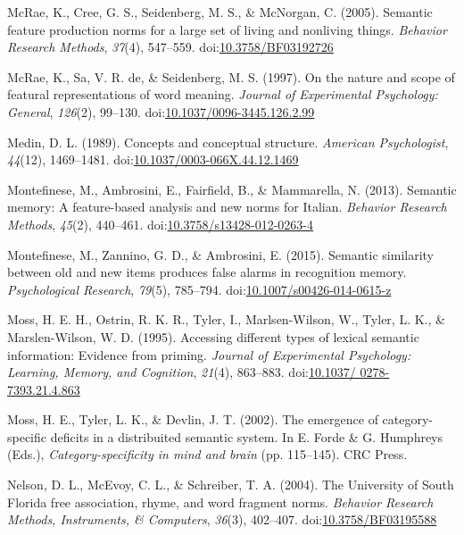 \documentclass[english,,man]{apa6}
\theoremstyle{definition}
\theoremstyle{definition}
\theoremstyle{definition}
\theoremstyle{remark}
\begin{document}
\hypertarget{ref-McRae2005}{}
McRae, K., Cree, G. S., Seidenberg, M. S., \& McNorgan, C. (2005).
Semantic feature production norms for a large set of living and
nonliving things. \emph{Behavior Research Methods}, \emph{37}(4),
547--559.
doi:\href{https://doi.org/10.3758/BF03192726}{10.3758/BF03192726}

\hypertarget{ref-McRae1997}{}
McRae, K., Sa, V. R. de, \& Seidenberg, M. S. (1997). On the nature and
scope of featural representations of word meaning. \emph{Journal of
Experimental Psychology: General}, \emph{126}(2), 99--130.
doi:\href{https://doi.org/10.1037/0096-3445.126.2.99}{10.1037/0096-3445.126.2.99}

\hypertarget{ref-Medin1989}{}
Medin, D. L. (1989). Concepts and conceptual structure. \emph{American
Psychologist}, \emph{44}(12), 1469--1481.
doi:\href{https://doi.org/10.1037/0003-066X.44.12.1469}{10.1037/0003-066X.44.12.1469}

\hypertarget{ref-Montefinese2013}{}
Montefinese, M., Ambrosini, E., Fairfield, B., \& Mammarella, N. (2013).
Semantic memory: A feature-based analysis and new norms for Italian.
\emph{Behavior Research Methods}, \emph{45}(2), 440--461.
doi:\href{https://doi.org/10.3758/s13428-012-0263-4}{10.3758/s13428-012-0263-4}

\hypertarget{ref-Montefinese2015}{}
Montefinese, M., Zannino, G. D., \& Ambrosini, E. (2015). Semantic
similarity between old and new items produces false alarms in
recognition memory. \emph{Psychological Research}, \emph{79}(5),
785--794.
doi:\href{https://doi.org/10.1007/s00426-014-0615-z}{10.1007/s00426-014-0615-z}

\hypertarget{ref-Moss1995}{}
Moss, H. E. H., Ostrin, R. K. R., Tyler, I., Marlsen-Wilson, W., Tyler,
L. K., \& Marslen-Wilson, W. D. (1995). Accessing different types of
lexical semantic information: Evidence from priming. \emph{Journal of
Experimental Psychology: Learning, Memory, and Cognition}, \emph{21}(4),
863--883.
doi:\href{https://doi.org/10.1037/\%200278-7393.21.4.863}{10.1037/ 0278-7393.21.4.863}

\hypertarget{ref-Moss2002}{}
Moss, H. E., Tyler, L. K., \& Devlin, J. T. (2002). The emergence of
category-specific deficits in a distribuited semantic system. In E.
Forde \& G. Humphreys (Eds.), \emph{Category-specificity in mind and
brain} (pp. 115--145). CRC Press.

\hypertarget{ref-Nelson2004}{}
Nelson, D. L., McEvoy, C. L., \& Schreiber, T. A. (2004). The University
of South Florida free association, rhyme, and word fragment norms.
\emph{Behavior Research Methods, Instruments, \& Computers},
\emph{36}(3), 402--407.
doi:\href{https://doi.org/10.3758/BF03195588}{10.3758/BF03195588}
\end{document}

